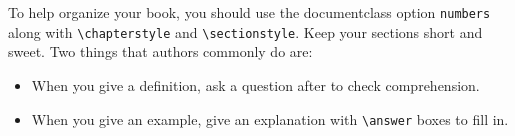 \documentclass{ximera}
\begin{document}
To help organize your book, you should use the documentclass option \verb!numbers! along with  \texttt{\textbackslash chapterstyle} and 
\texttt{\textbackslash sectionstyle}. Keep your sections short and sweet. Two things that authors commonly do are:
\begin{itemize}
  \item When you give a definition, ask a question after to check comprehension. 
  \item When you give an example, give an explanation with
        \texttt{\textbackslash answer} boxes to fill in.
\end{itemize}
\end{document}
